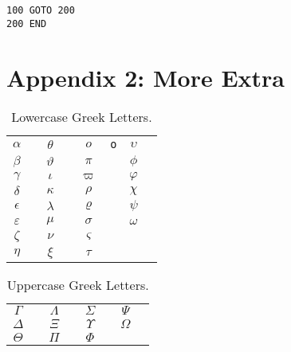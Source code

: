 \documentclass{report}
\begin{document}
\begin{verbatim}    
100 GOTO 200
200 END
\end{verbatim}    

\chapter*{Appendix 2: More Extra}


%
%
\newcommand{\X}[1]{$#1$&\texttt{\string#1}\hspace*{1ex}}
\newsavebox{\symbbox}
\newenvironment{symbols}[1]%
{\par\vspace*{2ex}
\begin{lrbox}{\symbbox}
\hspace*{4ex}\begin{tabular}{@{}#1@{}}}%
{\end{tabular}\end{lrbox}\makebox[\textwidth]{\usebox{\symbbox}}\par\medskip}



\begin{table}[!h]
\caption{Lowercase Greek Letters.}
\begin{symbols}{*4{cl}}
 \X{\alpha}     & \X{\theta}     & \X{o}          & \X{\upsilon}  \\
 \X{\beta}      & \X{\vartheta}  & \X{\pi}        & \X{\phi}      \\
 \X{\gamma}     & \X{\iota}      & \X{\varpi}     & \X{\varphi}   \\
 \X{\delta}     & \X{\kappa}     & \X{\rho}       & \X{\chi}      \\
 \X{\epsilon}   & \X{\lambda}    & \X{\varrho}    & \X{\psi}      \\
 \X{\varepsilon}& \X{\mu}        & \X{\sigma}     & \X{\omega}    \\
 \X{\zeta}      & \X{\nu}        & \X{\varsigma}  & &             \\
 \X{\eta}       & \X{\xi}        & \X{\tau} 
\end{symbols}
\end{table}

\begin{table}[!h]
\caption{Uppercase Greek Letters.}
\begin{symbols}{*4{cl}}
 \X{\Gamma}     & \X{\Lambda}    & \X{\Sigma}     & \X{\Psi}      \\
 \X{\Delta}     & \X{\Xi}        & \X{\Upsilon}   & \X{\Omega}    \\
 \X{\Theta}     & \X{\Pi}        & \X{\Phi} 
\end{symbols}
\end{table}
\end{document}
